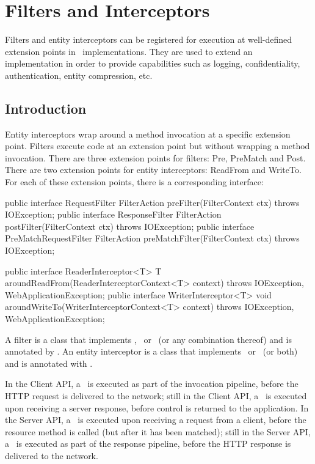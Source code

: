 \chapter{Filters and Interceptors}
\label{filters_and_interceptors}

Filters and entity interceptors can be registered for execution at well-defined extension points in \jaxrs\ implementations. They are used to extend an implementation in order to provide capabilities such as logging, confidentiality, authentication, entity compression, etc. 

\section{Introduction}
\label{introduction_filters}
Entity interceptors wrap around a method invocation at a specific extension point. 
Filters execute code at an extension point but without wrapping a method invocation.  There are three extension points for filters: Pre, PreMatch and Post. There are two extension points for entity interceptors: ReadFrom and WriteTo.  For each of these extension points, there is a corresponding interface:

\begin{listing}{1}
public interface RequestFilter {
    FilterAction preFilter(FilterContext ctx) throws IOException;
}
public interface ResponseFilter {
    FilterAction postFilter(FilterContext ctx) throws IOException;
}
public interface PreMatchRequestFilter {
    FilterAction preMatchFilter(FilterContext ctx) throws IOException;
}
\end{listing}

\begin{listing}{1}
public interface ReaderInterceptor<T> {
    T aroundReadFrom(ReaderInterceptorContext<T> context) 
        throws IOException, WebApplicationException;
}
public interface WriterInterceptor<T> {
    void aroundWriteTo(WriterInterceptorContext<T> context) 
        throws IOException, WebApplicationException;
}
\end{listing}

A filter is a class that implements \RequestFilter, \PreMatchRequestFilter\ or \ResponseFilter\ (or any combination thereof) and is annotated by \Provider. An entity interceptor is a class that implements \ReaderInterceptor\ or \WriterInterceptor\ (or both) and is annotated with \Provider. 

In the Client API, a \RequestFilter\ is executed as part of the invocation pipeline, before the HTTP request is delivered to the network; still in the Client API, a \ResponseFilter\ is executed upon receiving a server response, before control is returned to the application. 
In the Server API, a \RequestFilter\ is executed upon receiving a request from a client, before the resource method is called (but after it has been matched); still in the Server API, a \ResponseFilter\ is executed as part of the response pipeline, before the HTTP response is delivered to the network.

